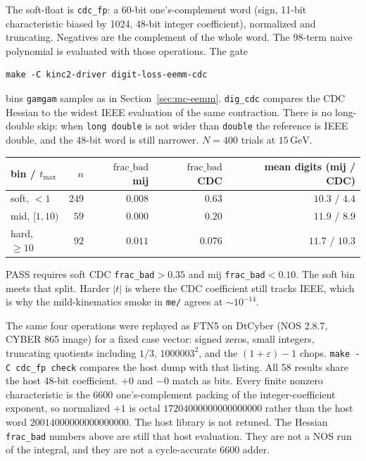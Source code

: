 \documentclass[11pt]{article}
\begin{document}
The soft-float is \texttt{cdc\_fp}: a 60-bit one's-complement word
(sign, 11-bit characteristic biased by 1024, 48-bit integer
coefficient), normalized and truncating. Negatives are the complement
of the whole word. The 98-term naive polynomial is evaluated with
those operations. The gate

\begin{verbatim}
make -C kinc2-driver digit-loss-eemm-cdc
\end{verbatim}

bins \texttt{gamgam} samples as in Section~\ref{sec:mc-eemm}.
\texttt{dig\_cdc} compares the CDC Hessian to the widest IEEE
evaluation of the same contraction. There is no long-double skip:
when \texttt{long double} is not wider than \texttt{double} the
reference is IEEE double, and the 48-bit word is still narrower.
$N=400$ trials at $15\,\mathrm{GeV}$.

\begin{center}
\begin{tabular}{@{}lrrrr@{}}
\toprule
bin / $t_{\max}$ & $n$ & $\mathrm{frac\_bad}$ mij &
  $\mathrm{frac\_bad}$ CDC & mean digits (mij / CDC) \\
\midrule
soft, $<1$ & $249$ & $0.008$ & $0.63$ & $10.3$ / $4.4$ \\
mid, $[1,10)$ & $59$ & $0.000$ & $0.20$ & $11.9$ / $8.9$ \\
hard, $\ge 10$ & $92$ & $0.011$ & $0.076$ & $11.7$ / $10.3$ \\
\bottomrule
\end{tabular}
\end{center}

PASS requires soft CDC \texttt{frac\_bad}$>0.35$ and mij
\texttt{frac\_bad}$<0.10$. The soft bin meets that split. Harder
$|t|$ is where the CDC coefficient still tracks IEEE, which is why
the mild-kinematics smoke in \texttt{me/} agrees at $\sim 10^{-14}$.

The same four operations were replayed as FTN5 on DtCyber (NOS 2.8.7,
CYBER 865 image) for a fixed case vector: signed zeros, small
integers, truncating quotients including $1/3$, $1000003^2$, and the
$(1+\varepsilon)-1$ chops.
\texttt{make -C cdc\_fp check} compares the host dump with that
listing. All 58 results share the host 48-bit coefficient. $+0$ and
$-0$ match as bits. Every finite nonzero characteristic is the 6600
one's-complement packing of the integer-coefficient exponent, so
normalized $+1$ is octal $17204000000000000000$ rather than the host
word $20014000000000000000$. The host library is not retuned. The
Hessian \texttt{frac\_bad} numbers above are still that host
evaluation. They are not a NOS run of the integral, and they are not
a cycle-accurate 6600 adder.
\end{document}
